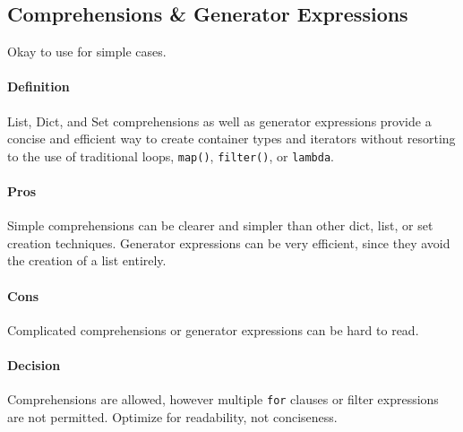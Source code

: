 \documentclass[
]{article}
\begin{document}
\subsection{Comprehensions \& Generator Expressions}

Okay to use for simple cases.

\paragraph{Definition}

List, Dict, and Set comprehensions as well as generator expressions
provide a concise and efficient way to create container types and
iterators without resorting to the use of traditional loops,
\texttt{map()}, \texttt{filter()}, or \texttt{lambda}.

\paragraph{Pros}

Simple comprehensions can be clearer and simpler than other dict, list,
or set creation techniques. Generator expressions can be very efficient,
since they avoid the creation of a list entirely.

\paragraph{Cons}

Complicated comprehensions or generator expressions can be hard to read.

\paragraph{Decision}

Comprehensions are allowed, however multiple \texttt{for} clauses or
filter expressions are not permitted. Optimize for readability, not
conciseness.
\end{document}
